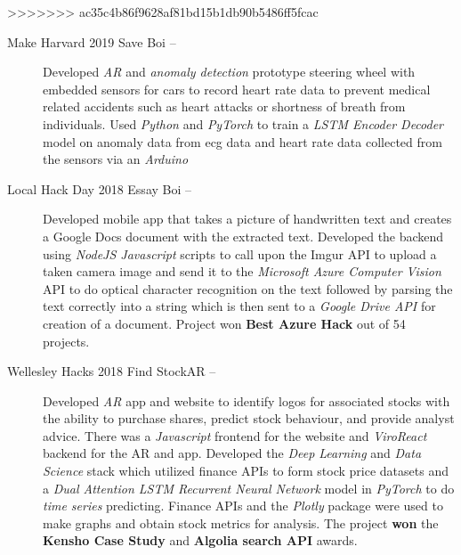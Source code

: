 \documentclass[letterpaper, 8pt]{extarticle}
\begin{document}
>>>>>>> ac35c4b86f9628af81bd15b1db90b5486ff5fcac
\begin{description}
\item[Make Harvard 2019 Save Boi --] Developed \emph{AR} and \emph{anomaly detection} prototype steering wheel with embedded sensors for cars to record heart rate data to prevent medical related accidents such as heart attacks or shortness of breath from individuals. Used \emph{Python} and \emph{PyTorch} to train a \emph{LSTM Encoder Decoder} model on anomaly data from ecg data and heart rate data collected from the sensors via an \emph{Arduino}
\item[Local Hack Day 2018 Essay Boi --] Developed mobile app that takes a picture of handwritten text and creates a Google Docs document with the extracted text. Developed the backend using \emph{NodeJS Javascript} scripts to call upon the Imgur API to upload a taken camera image and send it to the \emph{Microsoft Azure Computer Vision} API to do optical character recognition on the text followed by parsing the text correctly into a string which is then sent to a \emph{Google Drive API} for creation of a document. Project won \textbf{Best Azure Hack} out of 54 projects.

\begin{comment}
\item[Boston Hacks 2018 Vetricle --] Developed social network meet up app and website for Veterans to use to connect to other veterans and do projects and activities together. \emph{Javascript}, \emph{ReactJS/Native}, and \emph{Google Firebase} are used to create the app and website. \emph{Collaborative Filtering} through \emph{Cosine distance} and a \emph{Neural autoencoder} is used to create a friend recommender system made in \emph{Python} and \emph{PyTorch}. 
\end{comment}

\item[Wellesley Hacks 2018 Find StockAR --]Developed \emph{AR} app and website to identify logos for associated stocks with the ability to purchase shares, predict stock behaviour, and provide analyst advice. There was a \emph{Javascript} frontend for the website and \emph{ViroReact} backend for the AR and app. Developed the \emph{Deep Learning} and \emph{Data Science} stack which utilized finance APIs to form stock price datasets and a \emph{Dual Attention LSTM Recurrent Neural Network} model in \emph{PyTorch} to do \emph{time series} predicting. Finance APIs and the \emph{Plotly} package were used to make graphs and obtain stock metrics for analysis. The project \textbf{won} the \textbf{Kensho Case Study} and \textbf{Algolia search API} awards.


\end{description}
\end{document}
